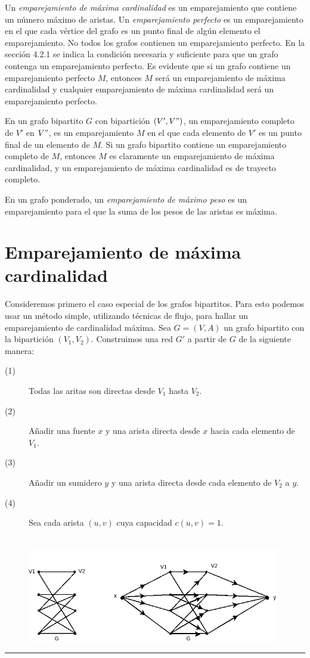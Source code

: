 \documentclass[10pt,a5paper]{book}
\begin{document}
Un \emph{emparejamiento de máxima cardinalidad} es un emparejamiento que contiene un número máximo de aristas. Un \emph{emparejamiento perfecto} es un emparejamiento en el que cada vértice del grafo es un punto final de algún elemento el emparejamiento. No todos los grafos contienen un emparejamiento perfecto. En la sección 4.2.1 se indica la condición necesaria y suficiente para que un grafo contenga un emparejamiento perfecto. Es evidente que si un grafo contiene un emparejamiento perfecto $M$, entonces $M$ será un emparejamiento de máxima cardinalidad y cualquier emparejamiento de máxima cardinalidad será un emparejamiento perfecto.

En un grafo bipartito $G$ con bipartición $(V',V")$, un emparejamiento completo de $V'$ en $V"$, es un emparejamiento $M$ en el que cada elemento de $V'$ es un punto final de un elemento de $M$. Si un grafo bipartito contiene un emparejamiento completo de $M$, entonces $M$ es claramente un emparejamiento de máxima cardinalidad, y un emparejamiento de máxima cardinalidad es de trayecto completo.

En un grafo ponderado, un \emph{emparejamiento de máximo peso} es un emparejamiento para el que la suma de los pesos de las aristas es máxima.

\section{Emparejamiento de máxima cardinalidad}

Consideremos primero el caso especial de los grafos bipartitos. Para esto podemos usar un método simple, utilizando técnicas de flujo, para hallar un emparejamiento de cardinalidad máxima. Sea $G = (V,A)$ un grafo bipartito con la bipartición $(V_1,V_2)$. Construimos una red $G'$ a partir de $G$ de la siguiente manera:
\begin{description}
\item[(1)] Todas las aritas son directas desde $V_1$ hasta $V_2$.
\item[(2)] Añadir una fuente $x$ y una arista directa desde $x$ hacia cada elemento de $V_1$.
\item[(3)] Añadir un sumidero $y$ y una arista directa desde cada elemento de $V_2$ a $y$.
\item[(4)] Sea cada arista $(u,v)$ cuya capacidad $c(u,v) = 1$.
\end{description}

\begin{figure}[H]
\caption{ }
\hrulefill{}\\
\hspace*{-.3in}\includegraphics[width=11cm]{Fig4_2.png}
\end{figure}
\hrule{}
\end{document}
